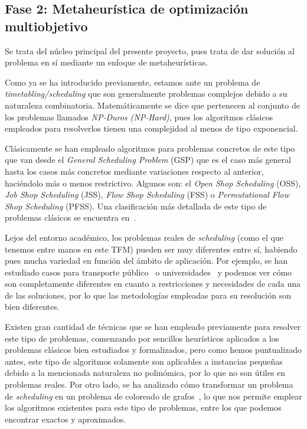 \subsection{Fase 2: Metaheurística de optimización multiobjetivo} \label{sec:3:metaheurística}
Se trata del núcleo principal del presente proyecto, pues trata de dar solución al problema en sí mediante un enfoque de metaheurísticas.

Como ya se ha introducido previamente, estamos ante un problema de \textit{timetabling/scheduling} que son generalmente problemas complejos debido a su naturaleza combinatoria.
Matemáticamente se dice que pertenecen al conjunto de los problemas llamados \textit{NP-Duros (NP-Hard)}, pues los algoritmos clásicos empleados para resolverlos tienen una complejidad al menos de tipo exponencial.

Clásicamente se han empleado algoritmos para problemas concretos de este tipo que van desde el \textit{General Scheduling Problem} (GSP) que es el caso más general hasta los casos más concretos mediante variaciones respecto al anterior, haciéndolo más o menos restrictivo.
Algunos son: el \textit{Open Shop Scheduling} (OSS), \textit{Job Shop Scheduling} (JSS), \textit{Flow Shop Scheduling} (FSS) o \textit{Permutational Flow Shop Scheduling} (PFSS). Una clasificación más detallada de este tipo de problemas clásicos se encuentra en~\cite{sota:tesis-doctoral}.

Lejos del entorno académico, los problemas reales de \textit{scheduling} (como el que tenemos entre manos en este TFM) pueden ser muy diferentes entre sí, habiendo pues mucha variedad en función del ámbito de aplicación.
Por ejemplo, se han estudiado casos para transporte público~\cite{sota:transporte-publico} o universidades~\cite{sota:universidad} y podemos ver cómo son completamente diferentes en cuanto a restricciones y necesidades de cada una de las soluciones, por lo que las metodologías empleadas para su resolución son bien diferentes.

Existen gran cantidad de técnicas que se han empleado previamente para resolver este tipo de problemas, comenzando por sencillos heurísticos aplicados a los problemas clásicos bien estudiados y formalizados, pero como hemos puntualizado antes, este tipo de algoritmos solamente son aplicables a instancias pequeñas debido a la mencionada naturaleza no polinómica, por lo que no son útiles en problemas reales. Por otro lado, se ha analizado cómo transformar un problema de \textit{scheduling} en un problema de coloreado de grafos~\cite{sota:estudio-coloreado-grafos, sota:algotimo-coloreado-grafos}, lo que nos permite emplear los algoritmos existentes para este tipo de problemas, entre los que podemos encontrar exactos y aproximados.

